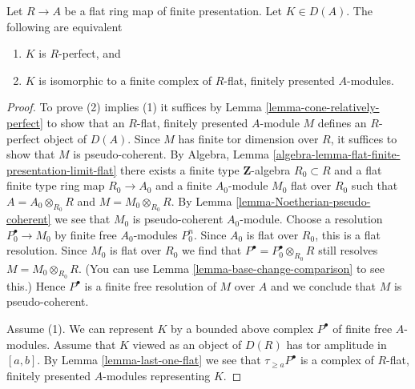 \begin{lemma}
\label{lemma-structure-relatively-perfect}
Let $R \to A$ be a flat ring map of finite presentation.
Let $K \in D(A)$. The following are equivalent
\begin{enumerate}
\item $K$ is $R$-perfect, and
\item $K$ is isomorphic to a finite complex of $R$-flat,
finitely presented $A$-modules.
\end{enumerate}
\end{lemma}

\begin{proof}
To prove (2) implies (1) it suffices by
Lemma \ref{lemma-cone-relatively-perfect}
to show that an $R$-flat, finitely presented $A$-module $M$ defines
an $R$-perfect object of $D(A)$. Since $M$ has finite tor dimension
over $R$, it suffices to show that $M$ is pseudo-coherent. By
Algebra, Lemma \ref{algebra-lemma-flat-finite-presentation-limit-flat}
there exists a finite type $\mathbf{Z}$-algebra $R_0 \subset R$
and a flat finite type ring map $R_0 \to A_0$ and
a finite $A_0$-module $M_0$ flat over $R_0$ such that
$A = A_0 \otimes_{R_0} R$ and $M = M_0 \otimes_{R_0} R$. By
Lemma \ref{lemma-Noetherian-pseudo-coherent}
we see that $M_0$ is pseudo-coherent $A_0$-module.
Choose a resolution $P_0^\bullet \to M_0$ by finite free
$A_0$-modules $P_0^n$. Since $A_0$ is flat over $R_0$,
this is a flat resolution. Since $M_0$ is flat over $R_0$
we find that $P^\bullet = P_0^\bullet \otimes_{R_0} R$
still resolves $M = M_0 \otimes_{R_0} R$. (You can use
Lemma \ref{lemma-base-change-comparison} to see this.)
Hence $P^\bullet$ is a finite free resolution of $M$
over $A$ and we conclude that $M$ is pseudo-coherent.

\medskip\noindent
Assume (1). We can represent $K$ by a bounded above complex
$P^\bullet$ of finite free $A$-modules. Assume that
$K$ viewed as an object of $D(R)$ has tor amplitude in $[a, b]$.
By Lemma \ref{lemma-last-one-flat} we see that
$\tau_{\geq a}P^\bullet$ is a complex of $R$-flat, finitely
presented $A$-modules representing $K$.
\end{proof}